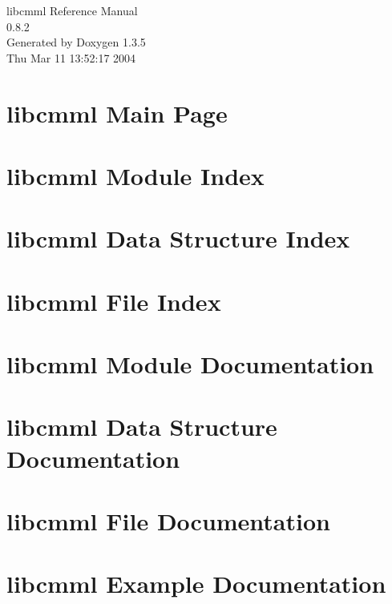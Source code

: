 \documentclass[a4paper]{book}
\begin{document}
\begin{titlepage}
\vspace*{7cm}
\begin{center}
{\Large libcmml Reference Manual\\[1ex]\large 0.8.2 }\\
\vspace*{1cm}
{\large Generated by Doxygen 1.3.5}\\
\vspace*{0.5cm}
{\small Thu Mar 11 13:52:17 2004}\\
\end{center}
\end{titlepage}
\clearemptydoublepage
{}
\tableofcontents
\clearemptydoublepage
{}
\chapter{libcmml Main Page}
\label{index}
\chapter{libcmml Module Index}

\chapter{libcmml Data Structure Index}

\chapter{libcmml File Index}

\chapter{libcmml Module Documentation}





\chapter{libcmml Data Structure Documentation}












\chapter{libcmml File Documentation}




\chapter{libcmml Example Documentation}








\printindex
\end{document}
